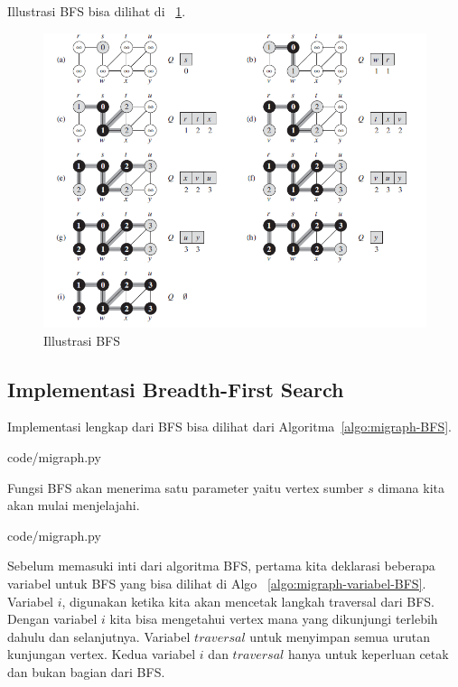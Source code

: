 Illustrasi BFS bisa dilihat di ~\ref{fig:BFS}.

\begin{figure}
    \includegraphics[width=\textwidth,keepaspectratio]{fig/BFS.png}%
	\caption{Illustrasi BFS}%
	\label{fig:BFS}%
\end{figure}

\subsection{Implementasi Breadth-First Search}

Implementasi lengkap dari BFS bisa dilihat dari Algoritma~\ref{algo:migraph-BFS}.


                {code/migraph.py}

Fungsi BFS akan menerima satu parameter yaitu vertex sumber $s$ dimana kita akan mulai menjelajahi.


                {code/migraph.py}

Sebelum memasuki inti dari algoritma BFS, pertama kita deklarasi beberapa variabel untuk BFS yang bisa dilihat di Algo ~\ref{algo:migraph-variabel-BFS}. Variabel $i$, digunakan ketika kita akan mencetak langkah traversal dari BFS. Dengan variabel $i$ kita bisa mengetahui vertex mana yang dikunjungi terlebih dahulu dan selanjutnya. Variabel $traversal$ untuk menyimpan semua urutan kunjungan vertex. Kedua variabel $i$ dan $traversal$ hanya untuk keperluan cetak dan bukan bagian dari BFS. 


